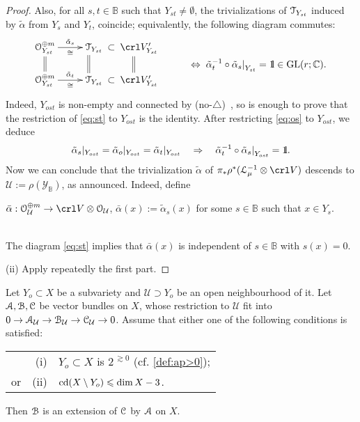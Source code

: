 \documentclass[11pt,reqno]{amsart}
\let\euf\EuScript
\let\cal\mathcal
\let\mbb\mathbb
\let\nit\noindent
\numberwithin{equation}{section}
\numberwithin{figure}{section}
\let\sm\setminus
\let\les\leqslant
\begin{document}
\begin{proof}
Also, for all $s,t\in{{\mbb B}}$ such that $Y_{st}\neq\emptyset$, 
the trivializations of ${{\euf T}}_{Y_{st}}$ induced by $\tilde{\alpha}$ from 
$Y_s$ and $Y_t$, coincide; equivalently, the following diagram commutes: 
\begin{equation}\label{eq:st}
\xymatrix@R=1.5em@C=2.5em{
{{\euf O}}_{Y_{st}}^{\oplus m}\ar[r]^-{\tilde\alpha_s}_-\cong\ar@{=}[d]
&
{{\euf T}}_{Y_{st}}\ar@<-.5ex>@{=}[d]
\kern-1.5ex\ar@{}[r]|-{\mbox{$\subset$}}
&
\kern-1.5ex
\crl V'_{Y_{st}}\ar@<-2ex>@{=}[d]
&
\ar@{}[d]^-{\mbox{$
\Leftrightarrow\;
{\tilde\alpha_t^{-1}\circ\tilde\alpha_s|}_{Y_{st}}={{1\kern-0.57ex\rm l}}\in{{\rm GL}}(r;\mbb C).
$}}
\\ 
{{\euf O}}_{Y_{st}}^{\oplus m}\ar[r]^-{\tilde\alpha_t}_-\cong
&
{{\euf T}}_{Y_{st}}
\kern-1.5ex\ar@{}[r]|-{\mbox{$\subset$}}
&
\kern-1.5ex
\crl V'_{Y_{st}}
&
}
\end{equation}
Indeed, $Y_{ost}$ is non-empty and connected by {\mbox{(no-$\triangle$)\ }}\kern-3pt, so is enough to prove 
that the restriction of \eqref{eq:st} to $Y_{ost}$  is the identity. 
After restricting \eqref{eq:os} to $Y_{ost}$, we deduce 
$$
\tilde{\alpha}_s|_{Y_{ost}}
=\tilde{\alpha}_o|_{Y_{ost}}
=\tilde{\alpha}_t|_{Y_{ost}}
\quad\Rightarrow\quad
{\tilde{\alpha}_t^{-1}\circ\tilde{\alpha}_s|}_{Y_{ost}}={{1\kern-0.57ex\rm l}}.
$$
Now we can conclude that the trivialization $\tilde\alpha$ of 
$\pi_*\rho^*({{\euf L}}_\mu^{-1}\otimes\crl V)$ descends to ${{\cal U}}:=\rho({{\cal Y}}_{{\mbb B}})$, 
as announced. Indeed, define 
\\[1ex] \centerline{
$\bar\alpha:{{\euf O}}_{{\cal U}}^{\oplus m}\to\crl V\otimes{{\euf O}}_{{\cal U}}$, 
$\bar\alpha(x):=\tilde\alpha_s(x)$ for some $s\in{{\mbb B}}$ such that  $x\in Y_s$. 
}\\[1ex]
The diagram \eqref{eq:st} implies that $\bar\alpha(x)$ is independent of 
$s\in{{\mbb B}}$ with $s(x)=0$. 

\nit(ii) Apply repeatedly the first part. 
\end{proof}

\begin{m-lemma}\label{lm:ext}
Let $Y_o\subset X$ be a subvariety and ${{\cal U}}\supset Y_o$ be an open neighbourhood 
of it. Let ${{\euf A}},{{\euf B}},{{\euf C}}$ be vector bundles on $X$, whose restriction to ${{\cal U}}$ fit into 
$0\to{{\euf A}}_{{\cal U}}\to{{\euf B}}_{{\cal U}}\to{{\euf C}}_{{\cal U}}\to 0$. Assume that either one of the following 
conditions is satisfied:

\begin{tabular}{rrl}
&{\rm(i)} & $Y_o\subset X$ is $2^{{\,\gtrsim0}}$ (cf. \ref{def:ap>0});
\\ 
{\rm or}\hspace{1ex}&{\rm(ii)} & ${{\rm cd}}(X\sm Y_o)\les\dim X-3$. 
\end{tabular}

\nit Then ${{\euf B}}$ is an extension of ${{\euf C}}$ by ${{\euf A}}$ on $X$. 
\end{m-lemma}
\end{document}
